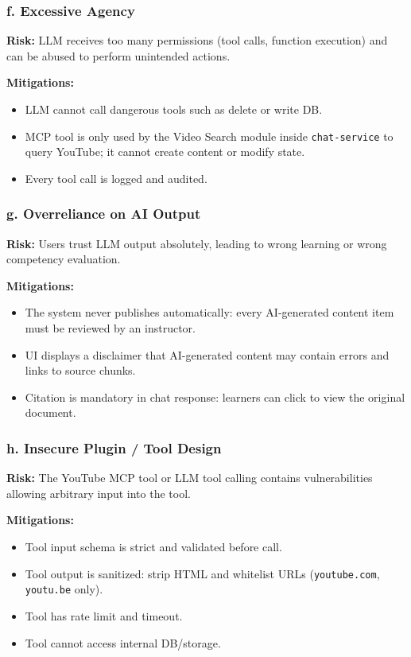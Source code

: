 \subsubsection*{f. Excessive Agency}

\textbf{Risk:} LLM receives too many permissions (tool calls, function
execution) and can be abused to perform unintended actions.

\textbf{Mitigations:}
\begin{itemize}
    \item LLM cannot call dangerous tools such as delete or write DB.
    \item MCP tool is only used by the Video Search module inside
          \texttt{chat-service} to query YouTube; it cannot create content
          or modify state.
    \item Every tool call is logged and audited.
\end{itemize}

\subsubsection*{g. Overreliance on AI Output}

\textbf{Risk:} Users trust LLM output absolutely, leading to wrong
learning or wrong competency evaluation.

\textbf{Mitigations:}
\begin{itemize}
    \item The system never publishes automatically: every AI-generated
          content item must be reviewed by an instructor.
    \item UI displays a disclaimer that AI-generated content may contain
          errors and links to source chunks.
    \item Citation is mandatory in chat response: learners can click to
          view the original document.
\end{itemize}

\subsubsection*{h. Insecure Plugin / Tool Design}

\textbf{Risk:} The YouTube MCP tool or LLM tool calling contains
vulnerabilities allowing arbitrary input into the tool.

\textbf{Mitigations:}
\begin{itemize}
    \item Tool input schema is strict and validated before call.
    \item Tool output is sanitized: strip HTML and whitelist URLs
          (\texttt{youtube.com}, \texttt{youtu.be} only).
    \item Tool has rate limit and timeout.
    \item Tool cannot access internal DB/storage.
\end{itemize}

